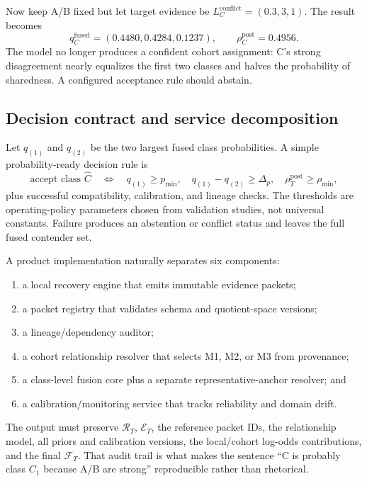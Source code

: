 \documentclass[11pt]{article}
\begin{document}
    Now keep A/B fixed but let target evidence be
    $L_C^{\mathrm{conflict}}=(0.3,3,1)$. The result becomes
    \begin{equation}
        q_C^{\mathrm{fused}}
        =(0.4480,0.4284,0.1237),
        \qquad
        \rho_C^{\mathrm{post}}=0.4956.
    \end{equation}
    The model no longer produces a confident cohort assignment: C's strong disagreement
    nearly equalizes the first two classes and halves the probability of sharedness. A
    configured acceptance rule should abstain.

    \subsection{Decision contract and service decomposition}

    Let $q_{(1)}$ and $q_{(2)}$ be the two largest fused class probabilities. A simple
    probability-ready decision rule is
    \begin{equation}
        \text{accept class }\widehat C
        \quad\Longleftrightarrow\quad
        q_{(1)}\ge p_{\min},
        \quad q_{(1)}-q_{(2)}\ge\Delta_p,
        \quad \rho_T^{\mathrm{post}}\ge\rho_{\min},
        \label{eq:cohort-acceptance-rule}
    \end{equation}
    plus successful compatibility, calibration, and lineage checks. The thresholds are
    operating-policy parameters chosen from validation studies, not universal constants.
    Failure produces an abstention or conflict status and leaves the full fused contender set.

    A product implementation naturally separates six components:
    \begin{enumerate}[nosep]
    \item a local recovery engine that emits immutable evidence packets;
    \item a packet registry that validates schema and quotient-space versions;
    \item a lineage/dependency auditor;
    \item a cohort relationship resolver that selects M1, M2, or M3 from provenance;
    \item a class-level fusion core plus a separate representative-anchor resolver; and
    \item a calibration/monitoring service that tracks reliability and domain drift.
    \end{enumerate}
    The output must preserve $\mathcal R_T$, $\mathcal E_T$, the reference packet IDs, the
    relationship model, all priors and calibration versions, the local/cohort log-odds
    contributions, and the final $\mathcal F_T$. That audit trail is what makes the sentence
    ``C is probably class $C_1$ because A/B are strong'' reproducible rather than rhetorical.
\end{document}
